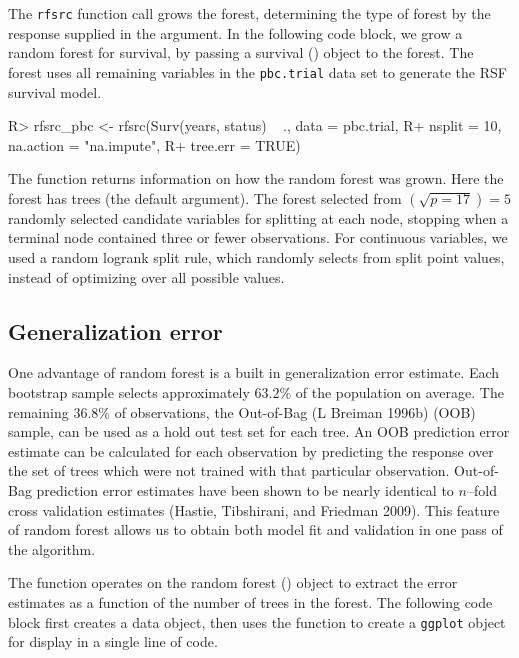 \documentclass[article]{jss}
\begin{document}
The  \texttt{rfsrc} function call grows the forest,
determining the type of forest by the response supplied in the
 argument. In the following code block, we grow a random
forest for survival, by passing a survival () object to the
forest. The forest uses all remaining variables in the
\texttt{pbc.trial} data set to generate the RSF survival model.

\begin{Schunk}
\begin{Sinput}
R> rfsrc_pbc <- rfsrc(Surv(years, status) ~ ., data = pbc.trial,
R+                    nsplit = 10, na.action = "na.impute", 
R+                    tree.err = TRUE)
\end{Sinput}
\end{Schunk}

The  function returns information on how the random
forest was grown. Here the  forest has
 trees (the default  argument). The
forest selected from \((\sqrt{p=17}) = 5\) randomly selected
candidate variables for splitting at each node, stopping when a terminal
node contained three or fewer observations. For continuous variables, we
used a random logrank split rule, which randomly selects from
 split point values, instead of optimizing over all
possible values.

\subsection{Generalization error}\label{generalization-error}

One advantage of random forest is a built in generalization error
estimate. Each bootstrap sample selects approximately \(63.2\%\) of the
population on average. The remaining \(36.8\%\) of observations, the
Out-of-Bag (L Breiman 1996b) (OOB) sample, can be used as a hold out
test set for each tree. An OOB prediction error estimate can be
calculated for each observation by predicting the response over the set
of trees which were not trained with that particular observation.
Out-of-Bag prediction error estimates have been shown to be nearly
identical to \(n\)--fold cross validation estimates (Hastie, Tibshirani,
and Friedman 2009). This feature of random forest allows us to obtain
both model fit and validation in one pass of the algorithm.

The  function operates on the random forest
() object to extract the error estimates as a function
of the number of trees in the forest. The following code block first
creates a  data object, then uses the
 function to create a \texttt{ggplot} object for
display in a single line of code.
\end{document}
